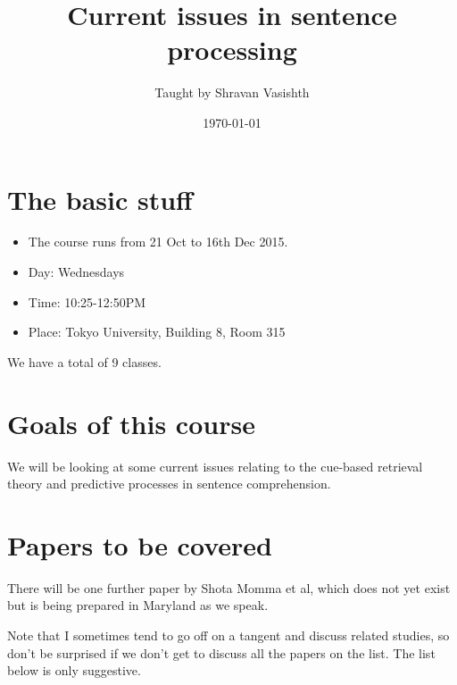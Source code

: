\documentclass[a4paper]{article}
\title{Current issues in sentence processing}
\author{Taught by Shravan Vasishth}
\date{\today}
\begin{document}
\ifpdf
{}
\else
{}
\fi

\maketitle



\section{The basic stuff}

\begin{itemize}
	\item The course runs from  21 Oct to 16th Dec 2015.
	\item Day: Wednesdays
	\item Time: 10:25-12:50PM
	\item Place: Tokyo University, Building 8, Room 315	
\end{itemize}

We have  a total of 9 classes.

\section{Goals of this course}

We will be looking at some current issues relating to the cue-based retrieval theory and predictive processes in sentence comprehension.

\section{Papers to be covered}

There will be one further paper by Shota Momma et al, which does not yet exist but is being prepared in Maryland as we speak.

Note that I sometimes tend to go off on a tangent and discuss related studies, so don't be surprised if we don't get to discuss all the papers on the list. The list below is only suggestive.
\end{document}
